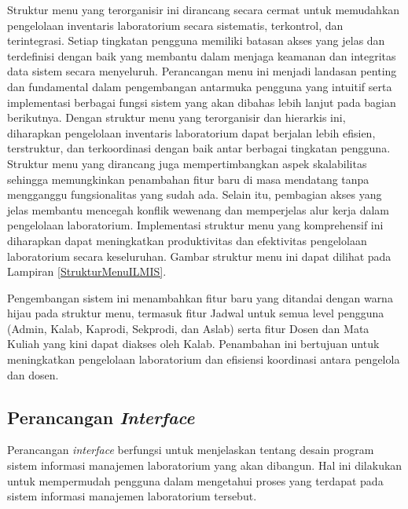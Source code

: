 Struktur menu yang terorganisir ini dirancang secara cermat untuk memudahkan pengelolaan inventaris laboratorium secara sistematis, terkontrol, dan terintegrasi. Setiap tingkatan pengguna memiliki batasan akses yang jelas dan terdefinisi dengan baik yang membantu dalam menjaga keamanan dan integritas data sistem secara menyeluruh. Perancangan menu ini menjadi landasan penting dan fundamental dalam pengembangan antarmuka pengguna yang intuitif serta implementasi berbagai fungsi sistem yang akan dibahas lebih lanjut pada bagian berikutnya. Dengan struktur menu yang terorganisir dan hierarkis ini, diharapkan pengelolaan inventaris laboratorium dapat berjalan lebih efisien, terstruktur, dan terkoordinasi dengan baik antar berbagai tingkatan pengguna. Struktur menu yang dirancang juga mempertimbangkan aspek skalabilitas sehingga memungkinkan penambahan fitur baru di masa mendatang tanpa mengganggu fungsionalitas yang sudah ada. Selain itu, pembagian akses yang jelas membantu mencegah konflik wewenang dan memperjelas alur kerja dalam pengelolaan laboratorium. Implementasi struktur menu yang komprehensif ini diharapkan dapat meningkatkan produktivitas dan efektivitas pengelolaan laboratorium secara keseluruhan. Gambar struktur menu ini dapat dilihat pada Lampiran \ref{StrukturMenuILMIS}.


Pengembangan sistem ini menambahkan fitur baru yang ditandai dengan warna hijau pada struktur menu, termasuk fitur Jadwal untuk semua level pengguna (Admin, Kalab, Kaprodi, Sekprodi, dan Aslab) serta fitur Dosen dan Mata Kuliah yang kini dapat diakses oleh Kalab. Penambahan ini bertujuan untuk meningkatkan pengelolaan laboratorium dan efisiensi koordinasi antara pengelola dan dosen.

\subsection{Perancangan \textit{Interface}}
Perancangan \textit{interface} berfungsi untuk menjelaskan tentang desain program sistem informasi manajemen laboratorium yang akan dibangun. Hal ini dilakukan untuk mempermudah pengguna dalam mengetahui proses yang terdapat pada sistem informasi manajemen laboratorium tersebut.


